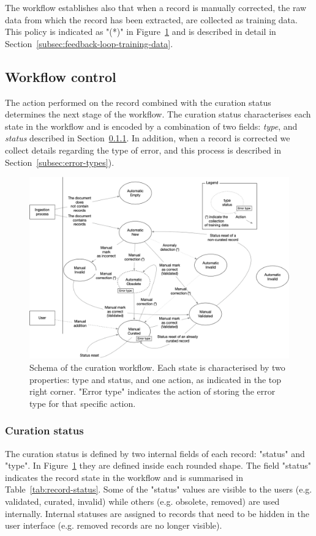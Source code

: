 \documentclass[a4paper]{article}
\begin{document}
The workflow establishes also that when a record is manually corrected, the raw data from which the record has been extracted, are collected as training data. This policy is indicated as "(*)" in Figure~\ref{fig:curation-workflow} and is described in detail in Section~\ref{subsec:feedback-loop-training-data}.

\subsection{Workflow control}
\label{subsec:workflow-control}

The action performed on the record combined with the curation status determines the next stage of the workflow. 
The curation status characterises each state in the workflow and is encoded by a combination of two fields: \emph{type}, and \emph{status} described in Section~\ref{subsec:curation-status}.
In addition, when a record is corrected we collect details regarding the type of error, and this process is described in Section~\ref{subsec:error-types}).

\begin{figure}[ht]
  \centering
  \includegraphics[width=1\textwidth]{images/record-correction} 
  \caption{Schema of the curation workflow. Each state is characterised by two properties: type and status, and one action, as indicated in the top right corner. "Error type" indicates the action of storing the error type for that specific action.}
  \label{fig:curation-workflow}
\end{figure}

\subsubsection{Curation status} 
\label{subsec:curation-status}
The curation status is defined by two internal fields of each record: "status" and "type". 
In Figure~\ref{fig:curation-workflow} they are defined inside each rounded shape. 
The field "status" indicates the record state in the workflow and is summarised in Table~\ref{tab:record-status}.
Some of the "status" values are visible to the users (e.g. validated, curated, invalid) while others (e.g. obsolete, removed) are used internally.
Internal statuses are assigned to records that need to be hidden in the user interface (e.g. removed records are no longer visible).
\end{document}
